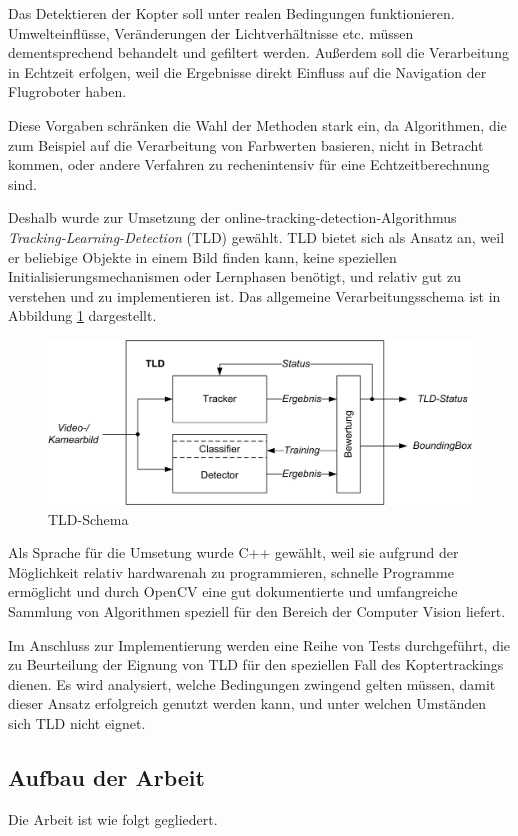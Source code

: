 Das Detektieren der Kopter soll unter realen Bedingungen funktionieren. Umwelteinflüsse, Veränderungen der Lichtverhältnisse etc. müssen dementsprechend behandelt und gefiltert werden. Außerdem soll die Verarbeitung in Echtzeit erfolgen, weil die Ergebnisse direkt Einfluss auf die Navigation der Flugroboter haben.

Diese Vorgaben schränken die Wahl der Methoden stark ein, da Algorithmen, die zum Beispiel auf die Verarbeitung von Farbwerten basieren, nicht in Betracht kommen, oder andere Verfahren zu rechenintensiv für eine Echtzeitberechnung sind.

Deshalb wurde zur Umsetzung der online-tracking-detection-Algorithmus \textit{Tracking-Learning-Detection} (TLD) gewählt. TLD bietet sich als Ansatz an, weil er beliebige Objekte in einem Bild finden kann, keine speziellen Initialisierungsmechanismen oder Lernphasen benötigt, und relativ gut zu verstehen und zu implementieren ist. Das allgemeine Verarbeitungsschema ist in Abbildung \ref{TLD-Schema} dargestellt.

\begin{figure}
\centering{}\includegraphics[scale=0.75]{../pictures/TLD-Framework.jpg}\caption{TLD-Schema}
\label{TLD-Schema}
\end{figure}

Als Sprache für die Umsetung wurde C++ gewählt, weil sie aufgrund der Möglichkeit relativ hardwarenah zu programmieren, schnelle Programme ermöglicht und durch OpenCV eine gut dokumentierte und umfangreiche Sammlung von Algorithmen speziell für den Bereich der Computer Vision liefert.

Im Anschluss zur Implementierung werden eine Reihe von Tests durchgeführt, die zu Beurteilung der Eignung von TLD für den speziellen Fall des Koptertrackings dienen. Es wird analysiert, welche Bedingungen zwingend gelten müssen, damit dieser Ansatz erfolgreich genutzt werden kann, und unter welchen Umständen sich TLD nicht eignet.


\subsection{Aufbau der Arbeit}
Die Arbeit ist wie folgt gegliedert.

